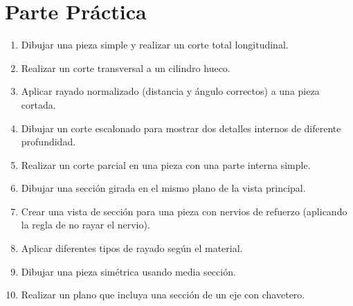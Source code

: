 \section{Parte Práctica}
\begin{enumerate}
	\item Dibujar una pieza simple y realizar un corte total longitudinal.
	\item Realizar un corte transversal a un cilindro hueco.
	\item Aplicar rayado normalizado (distancia y ángulo correctos) a
	      una pieza cortada.
	\item Dibujar un corte escalonado para mostrar dos detalles internos
	      de diferente profundidad.
	\item Realizar un corte parcial en una pieza con una parte interna simple.
	\item Dibujar una sección girada en el mismo plano de la vista principal.
	\item Crear una vista de sección para una pieza con nervios de
	      refuerzo (aplicando la regla de no rayar el nervio).
	\item Aplicar diferentes tipos de rayado según el material.
	\item Dibujar una pieza simétrica usando media sección.
	\item Realizar un plano que incluya una sección de un eje con chavetero.
\end{enumerate}
